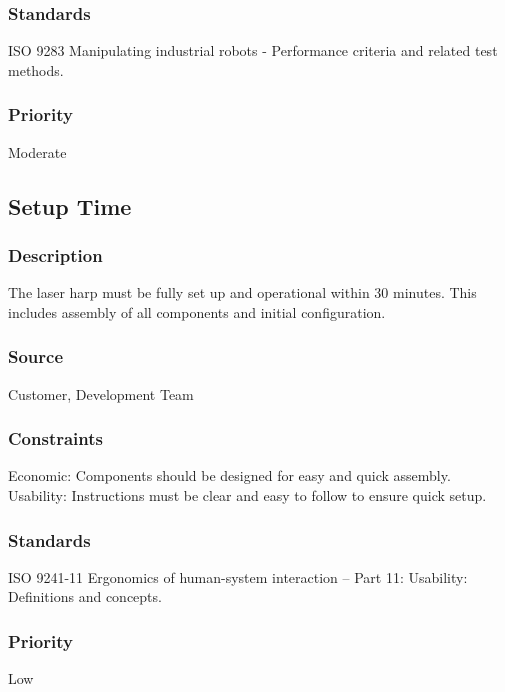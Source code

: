 \subsubsection{Standards}
ISO 9283 Manipulating industrial robots - Performance criteria and related test methods.
\subsubsection{Priority}
Moderate


\subsection{Setup Time}
\subsubsection{Description}
The laser harp must be fully set up and operational within 30 minutes. This includes assembly of all components and initial configuration.
\subsubsection{Source}
Customer, Development Team
\subsubsection{Constraints}
Economic: Components should be designed for easy and quick assembly.
Usability: Instructions must be clear and easy to follow to ensure quick setup.
\subsubsection{Standards}
ISO 9241-11 Ergonomics of human-system interaction – Part 11: Usability: Definitions and concepts.
\subsubsection{Priority}
Low
